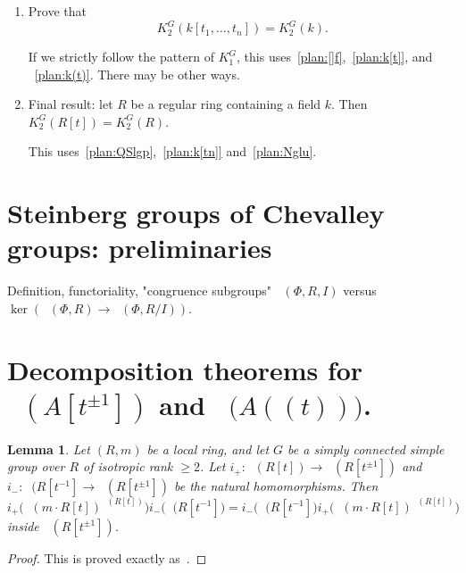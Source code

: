 \documentclass[oneside,12pt]{amsart}
\numberwithin{equation}{section}
\newtheorem{lem}{Lemma}
\numberwithin{lem}{section}
\theoremstyle{definition}
\theoremstyle{remark}
\DeclareMathOperator{\St}{St^G}
\begin{document}
\begin{enumerate}
\item\label{plan:k[tn]} Prove that
$$K_2^G(k[t_1,\ldots,t_n])=K_2^G(k).$$

If we strictly follow the pattern of $K_1^G$, this uses~\eqref{plan:[]f},~\eqref{plan:k[t]}, and
~\eqref{plan:k(t)}. There may be other ways.

\item \label{plan:final} Final result: let $R$ be a regular ring containing a field $k$. Then $K_2^G(R[t])=K_2^G(R)$.

This uses~\eqref{plan:QSlgp},~\eqref{plan:k[tn]} and~\eqref{plan:Nglu}.
\end{enumerate}

\section{Steinberg groups of Chevalley groups: preliminaries}

Definition, functoriality, "congruence subgroups"{} $\St(\Phi,R,I)$ versus $\ker(\St(\Phi,R)\to\St(\Phi,R/I))$.


\section{Decomposition theorems for $\St(A[t^{\pm 1}])$ and $\St\bigl(A((t))\bigr)$.}

\begin{lem}
 Let $(R,m)$ be a local ring, and let $G$ be a simply connected simple group over $R$
of isotropic rank $\ge 2$. Let $i_+:\St(R[t])\to\St(R[t^{\pm 1}])$ and $i_-:\St(R[t^{-1}]\to
\St(R[t^{\pm 1}])$ be the natural homomorphisms.
Then
$$
i_+\bigl(\St(m\cdot R[t])^{\St(R[t])}\bigr)i_-\bigl(\St(R[t^{-1}]\bigr)=i_-\bigl(\St(R[t^{-1}]\bigr)
i_+\bigl(\St(m\cdot R[t])^{\St(R[t])}\bigr)
$$
inside $\St(R[t^{\pm 1}])$.
\end{lem}
\begin{proof}
This is proved exactly as~\cite[Lemma 5.12]{St-poly}.
\end{proof}
\end{document}
